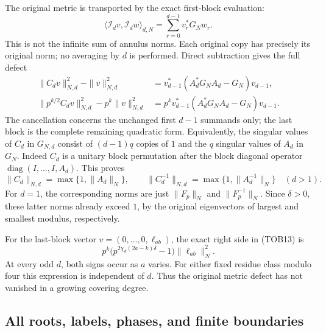 The original metric is transported by the exact first-block evaluation:
\begin{equation}\tag{TOB12}
 \langle\mathcal I_dv,\mathcal I_dw\rangle_{d,N}
   =\sum_{r=0}^{d-1}v_r^*G_Nw_r.
\end{equation}
This is not the infinite sum of annulus norms. Each original copy
has precisely its original norm; no averaging by $d$ is performed.
Direct subtraction gives the full defect
\begin{equation}\tag{TOB13}
\begin{split}
 \|C_dv\|_{N,d}^2-\|v\|_{N,d}^2
   &=v_{d-1}^*(A_d^*G_NA_d-G_N)v_{d-1},\\
 \|p^{k/2}C_dv\|_{N,d}^2-p^k\|v\|_{N,d}^2
   &=p^kv_{d-1}^*(A_d^*G_NA_d-G_N)v_{d-1}.
\end{split}
\end{equation}
The cancellation concerns the unchanged first $d-1$ summands only;
the last block is the complete remaining quadratic form.
Equivalently, the singular values of $C_d$ in $G_{N,d}$ consist
of $(d-1)q$ copies of $1$ and the $q$ singular values of $A_d$ in
$G_N$. Indeed $C_d$ is a unitary block permutation after the
block diagonal operator $\operatorname{diag}(I,\ldots,I,A_d)$.
This proves
\begin{equation}\tag{TOB14}
 \|C_d\|_{N,d}=\max\{1,\|A_d\|_N\},\qquad
 \|C_d^{-1}\|_{N,d}=\max\{1,\|A_d^{-1}\|_N\}
 \quad(d>1).
\end{equation}
For $d=1$, the corresponding norms are just $\|F_p\|_N$ and
$\|F_p^{-1}\|_N$. Since $\delta>0$, these latter norms already
exceed $1$, by the original eigenvectors of largest and smallest
modulus, respectively.

For the last-block vector $v=(0,\ldots,0,\ell_{ab})$, the exact
right side in (TOB13) is
\begin{equation}\tag{TOB15}
 p^k\bigl(p^{2\chi_d(2a-k)\delta}-1\bigr)
                         \|\ell_{ab}\|_N^2.
\end{equation}
At every odd $d$, both signs occur as $a$ varies. For either fixed
residue class modulo four this expression is independent of $d$.
Thus the original metric defect has not vanished in a growing
covering degree.

\subsection{All roots, labels, phases, and finite boundaries}

